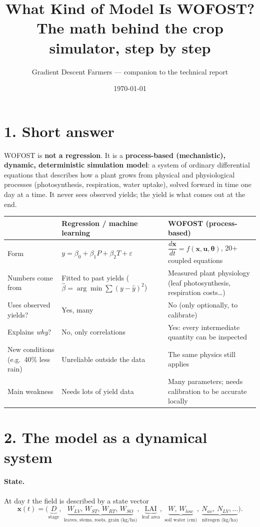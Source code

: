 \documentclass[11pt,a4paper]{article}
\title{What Kind of Model Is WOFOST?\\[0.3em]\large The math behind the crop simulator, step by step}
\author{Gradient Descent Farmers --- companion to the technical report}
\date{\today}
\begin{document}
\maketitle

\section*{1. Short answer}

WOFOST is \textbf{not a regression}. It is a \textbf{process-based (mechanistic), dynamic, deterministic simulation
model}: a system of ordinary differential equations that describes how a plant grows from physical and physiological
processes (photosynthesis, respiration, water uptake), solved forward in time one day at a time. It never sees observed
yields; the yield is what comes out at the end.

\begin{table}[h]
\centering\small
\begin{tabularx}{\linewidth}{lYY}
\toprule
 & \textbf{Regression / machine learning} & \textbf{WOFOST (process-based)} \\
\midrule
Form & \(y = \beta_0 + \beta_1 P + \beta_2 T + \varepsilon\) & \(\dfrac{d\mathbf{x}}{dt} = f(\mathbf{x}, \mathbf{u}, \boldsymbol\theta)\), 20+ coupled equations \\
Numbers come from & Fitted to past yields (\(\hat\beta = \arg\min \sum (y - \hat y)^2\)) & Measured plant physiology (leaf photosynthesis, respiration costs\ldots) \\
Uses observed yields? & Yes, many & No (only optionally, to calibrate) \\
Explains \emph{why}? & No, only correlations & Yes: every intermediate quantity can be inspected \\
New conditions (e.g.\ 40\% less rain) & Unreliable outside the data & The same physics still applies \\
Main weakness & Needs lots of yield data & Many parameters; needs calibration to be accurate locally \\
\bottomrule
\end{tabularx}
\end{table}

\section*{2. The model as a dynamical system}

\paragraph{State.} At day \(t\) the field is described by a state vector
\begin{equation}
  \mathbf{x}(t) = \big(\underbrace{D}_{\text{stage}},\
  \underbrace{W_{LV},\, W_{ST},\, W_{RT},\, W_{SO}}_{\text{leaves, stems, roots, grain (kg/ha)}},\
  \underbrace{\mathrm{LAI}}_{\text{leaf area}},\
  \underbrace{W,\, W_{low}}_{\text{soil water (cm)}},\
  \underbrace{N_{av},\, N_{LV}, \ldots}_{\text{nitrogen (kg/ha)}}\big).
\end{equation}
\end{document}
